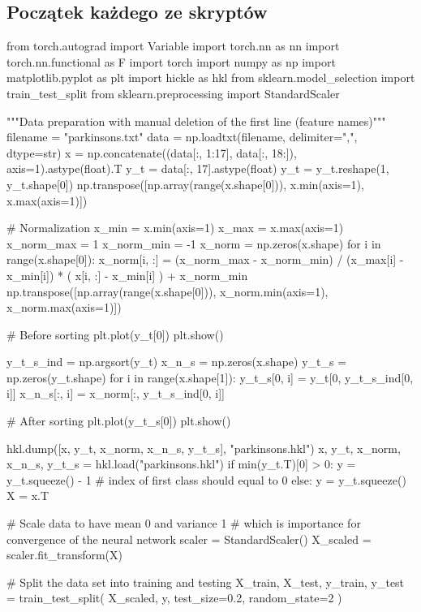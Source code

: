 \documentclass{article}
\begin{document}
\subsection{Początek każdego ze skryptów}
\begin{python}
    from torch.autograd import Variable
    import torch.nn as nn
    import torch.nn.functional as F
    import torch
    import numpy as np
    import matplotlib.pyplot as plt
    import hickle as hkl
    from sklearn.model_selection import train_test_split
    from sklearn.preprocessing import StandardScaler

    """Data preparation with manual deletion of the first line (feature names)"""
    filename = "parkinsons.txt"
    data = np.loadtxt(filename, delimiter=",", dtype=str)
    x = np.concatenate((data[:, 1:17], data[:, 18:]), axis=1).astype(float).T
    y_t = data[:, 17].astype(float)
    y_t = y_t.reshape(1, y_t.shape[0])
    np.transpose([np.array(range(x.shape[0])), x.min(axis=1), x.max(axis=1)])

    # Normalization
    x_min = x.min(axis=1)
    x_max = x.max(axis=1)
    x_norm_max = 1
    x_norm_min = -1
    x_norm = np.zeros(x.shape)
    for i in range(x.shape[0]):
    x_norm[i, :] = (x_norm_max - x_norm_min) / (x_max[i] - x_min[i]) * (
    x[i, :] - x_min[i]
    ) + x_norm_min
    np.transpose([np.array(range(x.shape[0])),
            x_norm.min(axis=1), x_norm.max(axis=1)])

    # Before sorting
    plt.plot(y_t[0])
    plt.show()

    y_t_s_ind = np.argsort(y_t)
    x_n_s = np.zeros(x.shape)
    y_t_s = np.zeros(y_t.shape)
    for i in range(x.shape[1]):
    y_t_s[0, i] = y_t[0, y_t_s_ind[0, i]]
    x_n_s[:, i] = x_norm[:, y_t_s_ind[0, i]]

    # After sorting
    plt.plot(y_t_s[0])
    plt.show()

    hkl.dump([x, y_t, x_norm, x_n_s, y_t_s], "parkinsons.hkl")
    x, y_t, x_norm, x_n_s, y_t_s = hkl.load("parkinsons.hkl")
    if min(y_t.T)[0] > 0:
    y = y_t.squeeze() - 1  # index of first class should equal to 0
    else:
    y = y_t.squeeze()
    X = x.T

    # Scale data to have mean 0 and variance 1
    # which is importance for convergence of the neural network
    scaler = StandardScaler()
    X_scaled = scaler.fit_transform(X)

    # Split the data set into training and testing
    X_train, X_test, y_train, y_test = train_test_split(
    X_scaled, y, test_size=0.2, random_state=2
    )
\end{python}
\end{document}
